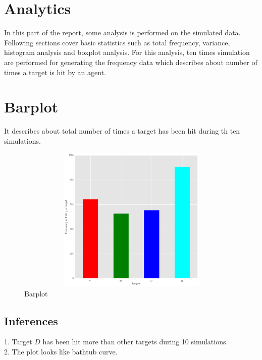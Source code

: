 \documentclass[11pt]{report}
\begin{document}
\newpage
\section{\color{cyan} Analytics}
In this part of the report, some analysis is performed on the simulated data. Following sections cover basic statistics such as total frequency, variance, histogram analysis and boxplot analysis.
For this analysis, ten times simulation are performed for generating the frequency data which describes about number of times a target is hit by an agent.

\section{Barplot}
It describes about total number of times a target has been hit during th ten simulations.

\begin{figure}[h!]
  \centering
  \includegraphics[height = 7cm, width = 14cm]{barplot.png}
  \caption{Barplot}
  \label{fig:barplot}
\end{figure}
\subsection{Inferences}
1. Target $D$ has been hit more than other targets during 10 simulations.\\ 
2. The plot looks like bathtub curve.
\end{document}
